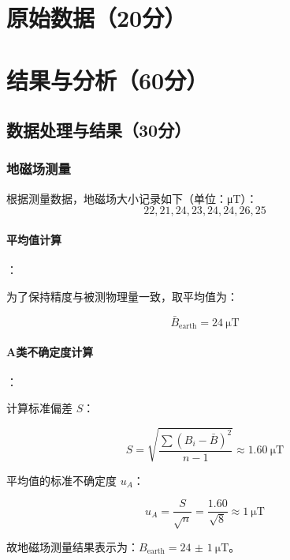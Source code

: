 \documentclass{../template/Report}%
\begin{document}
\begin{fullreportonly}
    \section{原始数据（20分）}
    \section{结果与分析（60分）}
    \subsection{数据处理与结果（30分）}

    \subsubsection{地磁场测量}
    根据测量数据，地磁场大小记录如下（单位：\unit{\micro\tesla}）：
    \begin{equation*}
        22, 21, 24, 23, 24, 24, 26, 25
    \end{equation*}

    \paragraph{平均值计算}：

    为了保持精度与被测物理量一致，取平均值为：

    \begin{equation*}
        \bar{B}_{\text{earth}} = \SI{24}{\micro\tesla}
    \end{equation*}

    \paragraph{A类不确定度计算}：

    计算标准偏差 $S$：

    \begin{equation*}
        S = \sqrt{\frac{\sum(B_i - \bar{B})^2}{n-1}} \approx \SI{1.60}{\micro\tesla}
    \end{equation*}

    平均值的标准不确定度 $u_A$：

    \begin{equation*}
        u_A = \frac{S}{\sqrt{n}} = \frac{1.60}{\sqrt{8}} \approx \SI{1}{\micro\tesla}
    \end{equation*}

    故地磁场测量结果表示为：$B_{\text{earth}} = \SI{24(1)}{\micro\tesla}$。


\end{fullreportonly}
\end{document}
